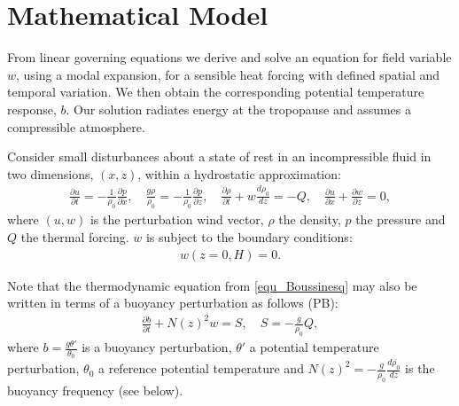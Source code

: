 \documentclass[a4paper,10pt]{article}
\begin{document}
\section{Mathematical Model}
\label{sec_Model}
%
From linear governing equations we derive and solve an equation for field variable $w$, 
using a modal expansion, for a sensible heat forcing with defined spatial and temporal variation.
We then obtain the corresponding potential temperature response, $b$. 
Our solution radiates energy at the tropopause and assumes a compressible atmosphere.

Consider small disturbances about a state of rest in an incompressible fluid in two dimensions, $(x, z)$,
within a hydrostatic approximation:
%
\begin{eqnarray}
\label{equ_Boussinesq}
\frac{\partial u}{\partial t}  = - \frac{1}{\rho_0} \frac{\partial p}{\partial x}, \quad
\frac{g \rho}{\rho_0}  =  - \frac{1}{\rho_0}  \frac{\partial p}{\partial z}, \quad
\frac{\partial \rho}{\partial t} +  w \frac{d \rho_0}{dz}  =  -Q, \quad
\frac{\partial u}{\partial x} + \frac{\partial w}{\partial z}  =  0, 
\end{eqnarray}
%
where $(u, w)$ is the perturbation wind vector, $\rho$ the density, $p$ the pressure and $Q$ the thermal forcing.
$w$ is subject to the boundary conditions:
%
\begin{eqnarray}
\label{bcs}
w(z = 0, H) = 0. 
\end{eqnarray}

Note that the thermodynamic equation from \ref{equ_Boussinesq} may also be written in terms of 
a buoyancy perturbation as follows (PB):
%
\begin{eqnarray}
\label{equ_b}
\frac{\partial b }{\partial t} + N(z)^2 w = S, \quad S = - \frac{g }{ \rho_0 } Q,
\end{eqnarray}
%
where $b = \frac{g \theta'}{\theta_0}$ is a buoyancy perturbation, $\theta'$ a potential temperature perturbation, 
$\theta_0$ a reference potential temperature and $N(z)^2 =-\frac{g}{\rho_0}\frac{d \bar{\rho_0}}{dz}$ is the buoyancy frequency 
(see below).
\end{document}
